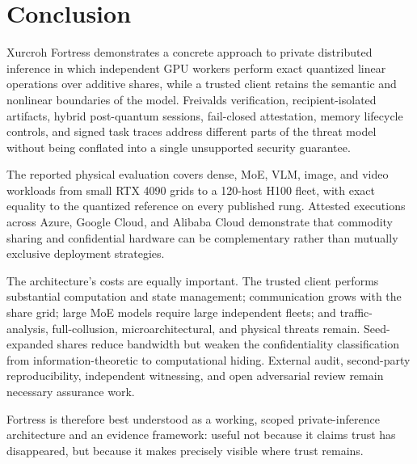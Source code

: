\section{Conclusion}\label{sec:conclusion}

Xurcroh Fortress demonstrates a concrete approach to private distributed inference in which independent GPU workers perform exact quantized linear operations over additive shares, while a trusted client retains the semantic and nonlinear boundaries of the model. Freivalds verification, recipient-isolated artifacts, hybrid post-quantum sessions, fail-closed attestation, memory lifecycle controls, and signed task traces address different parts of the threat model without being conflated into a single unsupported security guarantee.

The reported physical evaluation covers dense, MoE, VLM, image, and video workloads from small RTX 4090 grids to a 120-host H100 fleet, with exact equality to the quantized reference on every published rung. Attested executions across Azure, Google Cloud, and Alibaba Cloud demonstrate that commodity sharing and confidential hardware can be complementary rather than mutually exclusive deployment strategies.

The architecture's costs are equally important. The trusted client performs substantial computation and state management; communication grows with the share grid; large MoE models require large independent fleets; and traffic-analysis, full-collusion, microarchitectural, and physical threats remain. Seed-expanded shares reduce bandwidth but weaken the confidentiality classification from information-theoretic to computational hiding. External audit, second-party reproducibility, independent witnessing, and open adversarial review remain necessary assurance work.

Fortress is therefore best understood as a working, scoped private-inference architecture and an evidence framework: useful not because it claims trust has disappeared, but because it makes precisely visible where trust remains.
